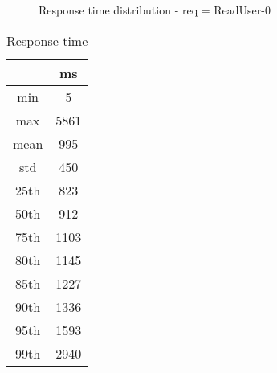 \begin{minipage}{0.75\linewidth}
\begin{figure}[h]
\begin{adjustbox}{max width=1.0\linewidth, keepaspectratio}
  \end{adjustbox}
  \caption{Response time distribution - req = ReadUser-0}
\end{figure}
\end{minipage}\hfill\begin{minipage}{0.18\linewidth}
\begin{table}[h]
\begin{tabular}{|cc|}
\hline
\textbf{} & \textbf{ms}\\ \hline
 \Xhline{0.005\arrayrulewidth}
min & 5\\
 \Xhline{0.005\arrayrulewidth}
max & 5861\\
 \Xhline{0.005\arrayrulewidth}
mean & 995\\
 \Xhline{0.005\arrayrulewidth}
std & 450\\
\hline
\hline
 \Xhline{0.005\arrayrulewidth}
25th & 823\\
 \Xhline{0.005\arrayrulewidth}
50th & 912\\
 \Xhline{0.005\arrayrulewidth}
75th & 1103\\
 \Xhline{0.005\arrayrulewidth}
80th & 1145\\
 \Xhline{0.005\arrayrulewidth}
85th & 1227\\
 \Xhline{0.005\arrayrulewidth}
90th & 1336\\
 \Xhline{0.005\arrayrulewidth}
95th & 1593\\
 \Xhline{0.005\arrayrulewidth}
99th & 2940\\
\hline
\end{tabular}
\caption{Response time}
\end{table}
\end{minipage}\hfill